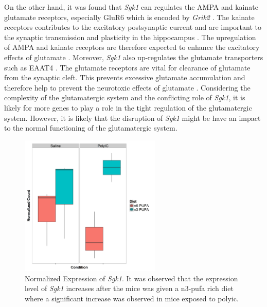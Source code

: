 On the other hand, it was found that \textit{Sgk1} can regulates the AMPA and kainate glutamate receptors, especially GluR6 which is encoded by \textit{Grik2} \citep{Lang2006,Lang2010}.
The kainate receptors contributes to the excitatory postsynaptic current and are important to the synaptic transmission and plasticity in the hippocampus \citep{Lang2006}.
The upregulation of AMPA and kainate receptors are therefore expected to enhance the excitatory effects of glutamate \citep{Lang2010}.
Moreover, \textit{Sgk1} also up-regulates the glutamate transporters such as EAAT4 \citep{Bohmer2004}.
The glutamate receptors are vital for clearance of glutamate from the synaptic cleft.
This prevents excessive glutamate accumulation and therefore help to prevent the neurotoxic effects of glutamate \citep{Lang2010}.
Considering the complexity of the glutamatergic system and the conflicting role of \textit{Sgk1}, it is likely for more genes to play a role in the tight regulation of the glutamatergic system.
However, it is likely that the disruption of \textit{Sgk1} might be have an impact to the normal functioning of the glutamatergic system.

\begin{figure}
	\centering
	\includegraphics[width=0.6\textwidth]{figure/omega/Sgk1_expression.png}
	\caption[Normalized Expression of \textit{Sgk1}]{
		Normalized Expression of \textit{Sgk1}.
		It was observed that the expression level of \textit{Sgk1} increases after the mice was given a n3-\gls{pufa} rich diet where a significant increase was observed in mice exposed to \gls{polyic}.
	}\label{fig:sgk1Express}
\end{figure}

